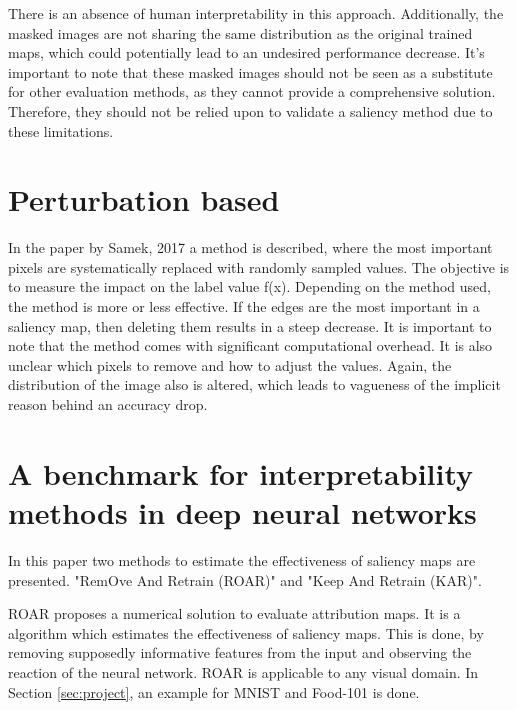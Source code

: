 There is an absence of human interpretability in this approach. Additionally, the masked images are not sharing the same distribution as the original trained maps, which could potentially lead to an undesired performance decrease. It's important to note that these masked images should not be seen as a substitute for other evaluation methods, as they cannot provide a comprehensive solution. Therefore, they should not be relied upon to validate a saliency method due to these limitations.

\section{Perturbation based}
\label{pertubation}

In the paper by Samek, 2017 \cite{samek2017} a method is described, where the most important pixels are systematically replaced with randomly sampled values. The objective is to measure the impact on the label value f(x). Depending on the method used, the method is more or less effective. If the edges are the most important in a saliency map, then deleting them results in a steep decrease.
It is important to note that the method comes with significant computational overhead. It is also unclear which pixels to remove and how to adjust the values. Again, the distribution of the image also is altered, which leads to vagueness of the implicit reason behind an accuracy drop.

\section{A benchmark for interpretability methods in deep neural networks }

In this paper \cite{hooker2019benchmark} two methods to estimate the effectiveness of saliency maps are presented. "RemOve And Retrain (ROAR)" and "Keep And Retrain (KAR)". 

ROAR proposes a numerical solution to evaluate attribution maps. It is a algorithm which estimates the effectiveness of saliency maps. This is done, by removing supposedly informative features from the input and observing the reaction of the neural network. ROAR is applicable to any visual domain. In Section \ref{sec:project}, an example for MNIST and Food-101 is done.


